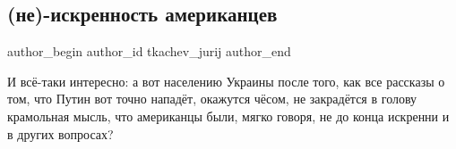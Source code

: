  
 
 
 
 
\subsection{(не)-искренность американцев}
\label{sec:22_01_2022.tg.tkachev_jurij.1.amerikancy}
 
\ifcmt
 author_begin
   author_id tkachev_jurij
 author_end
\fi

\begin{zznagolos}
И всё-таки интересно: а вот населению Украины после того, как все рассказы о
том, что Путин вот точно нападёт, окажутся чёсом, не закрадётся в голову
крамольная мысль, что американцы были, мягко говоря, не до конца искренни и в
других вопросах?
\end{zznagolos}

